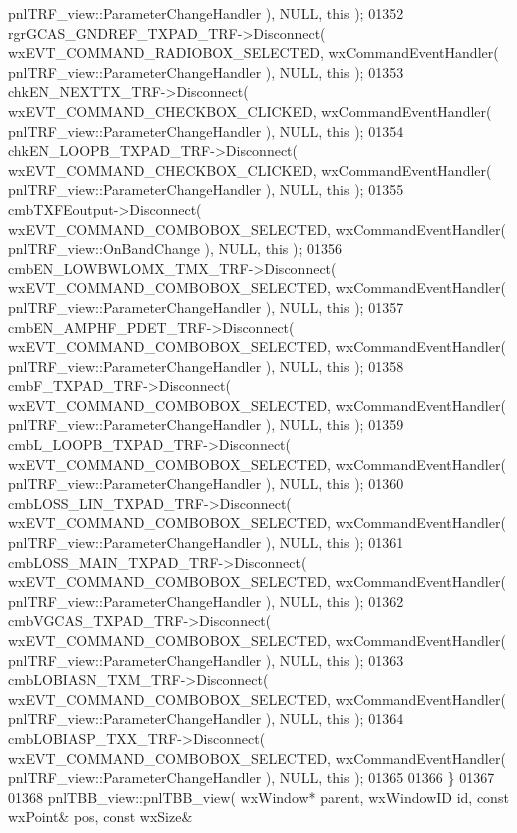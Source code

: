 \begin{DoxyCode}
      pnlTRF_view::ParameterChangeHandler ), NULL, \textcolor{keyword}{this} );
01352     rgrGCAS_GNDREF_TXPAD_TRF->Disconnect( wxEVT\_COMMAND\_RADIOBOX\_SELECTED, wxCommandEventHandler( 
      pnlTRF_view::ParameterChangeHandler ), NULL, \textcolor{keyword}{this} );
01353     chkEN_NEXTTX_TRF->Disconnect( wxEVT\_COMMAND\_CHECKBOX\_CLICKED, wxCommandEventHandler( 
      pnlTRF_view::ParameterChangeHandler ), NULL, \textcolor{keyword}{this} );
01354     chkEN_LOOPB_TXPAD_TRF->Disconnect( wxEVT\_COMMAND\_CHECKBOX\_CLICKED, wxCommandEventHandler( 
      pnlTRF_view::ParameterChangeHandler ), NULL, \textcolor{keyword}{this} );
01355     cmbTXFEoutput->Disconnect( wxEVT\_COMMAND\_COMBOBOX\_SELECTED, wxCommandEventHandler( 
      pnlTRF_view::OnBandChange ), NULL, \textcolor{keyword}{this} );
01356     cmbEN_LOWBWLOMX_TMX_TRF->Disconnect( wxEVT\_COMMAND\_COMBOBOX\_SELECTED, wxCommandEventHandler( 
      pnlTRF_view::ParameterChangeHandler ), NULL, \textcolor{keyword}{this} );
01357     cmbEN_AMPHF_PDET_TRF->Disconnect( wxEVT\_COMMAND\_COMBOBOX\_SELECTED, wxCommandEventHandler( 
      pnlTRF_view::ParameterChangeHandler ), NULL, \textcolor{keyword}{this} );
01358     cmbF_TXPAD_TRF->Disconnect( wxEVT\_COMMAND\_COMBOBOX\_SELECTED, wxCommandEventHandler( 
      pnlTRF_view::ParameterChangeHandler ), NULL, \textcolor{keyword}{this} );
01359     cmbL_LOOPB_TXPAD_TRF->Disconnect( wxEVT\_COMMAND\_COMBOBOX\_SELECTED, wxCommandEventHandler( 
      pnlTRF_view::ParameterChangeHandler ), NULL, \textcolor{keyword}{this} );
01360     cmbLOSS_LIN_TXPAD_TRF->Disconnect( wxEVT\_COMMAND\_COMBOBOX\_SELECTED, wxCommandEventHandler( 
      pnlTRF_view::ParameterChangeHandler ), NULL, \textcolor{keyword}{this} );
01361     cmbLOSS_MAIN_TXPAD_TRF->Disconnect( wxEVT\_COMMAND\_COMBOBOX\_SELECTED, wxCommandEventHandler( 
      pnlTRF_view::ParameterChangeHandler ), NULL, \textcolor{keyword}{this} );
01362     cmbVGCAS_TXPAD_TRF->Disconnect( wxEVT\_COMMAND\_COMBOBOX\_SELECTED, wxCommandEventHandler( 
      pnlTRF_view::ParameterChangeHandler ), NULL, \textcolor{keyword}{this} );
01363     cmbLOBIASN_TXM_TRF->Disconnect( wxEVT\_COMMAND\_COMBOBOX\_SELECTED, wxCommandEventHandler( 
      pnlTRF_view::ParameterChangeHandler ), NULL, \textcolor{keyword}{this} );
01364     cmbLOBIASP_TXX_TRF->Disconnect( wxEVT\_COMMAND\_COMBOBOX\_SELECTED, wxCommandEventHandler( 
      pnlTRF_view::ParameterChangeHandler ), NULL, \textcolor{keyword}{this} );
01365     
01366 \}
01367 
01368 pnlTBB_view::pnlTBB_view( wxWindow* parent, wxWindowID \textcolor{keywordtype}{id}, \textcolor{keyword}{const} wxPoint& pos, \textcolor{keyword}{const} wxSize& 

\end{DoxyCode}
